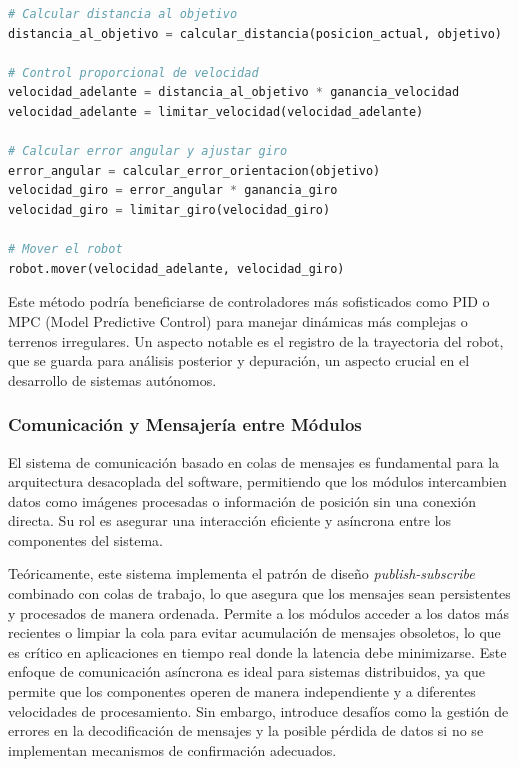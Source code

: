 \begin{lstlisting}[language=Python, caption=Control proporcional para navegación, label=lst:control_proporcional]
# Calcular distancia al objetivo
distancia_al_objetivo = calcular_distancia(posicion_actual, objetivo)

# Control proporcional de velocidad
velocidad_adelante = distancia_al_objetivo * ganancia_velocidad
velocidad_adelante = limitar_velocidad(velocidad_adelante)

# Calcular error angular y ajustar giro
error_angular = calcular_error_orientacion(objetivo)
velocidad_giro = error_angular * ganancia_giro
velocidad_giro = limitar_giro(velocidad_giro)

# Mover el robot
robot.mover(velocidad_adelante, velocidad_giro)
\end{lstlisting}

Este método podría beneficiarse de controladores más sofisticados como PID o MPC (Model Predictive Control) para manejar dinámicas más complejas o terrenos irregulares. Un aspecto notable es el registro de la trayectoria del robot, que se guarda para análisis posterior y depuración, un aspecto crucial en el desarrollo de sistemas autónomos.

\subsubsection{Comunicación y Mensajería entre Módulos}

El sistema de comunicación basado en colas de mensajes es fundamental para la arquitectura desacoplada del software, permitiendo que los módulos intercambien datos como imágenes procesadas o información de posición sin una conexión directa. Su rol es asegurar una interacción eficiente y asíncrona entre los componentes del sistema.

Teóricamente, este sistema implementa el patrón de diseño \textit{publish-subscribe} combinado con colas de trabajo, lo que asegura que los mensajes sean persistentes y procesados de manera ordenada. Permite a los módulos acceder a los datos más recientes o limpiar la cola para evitar acumulación de mensajes obsoletos, lo que es crítico en aplicaciones en tiempo real donde la latencia debe minimizarse. Este enfoque de comunicación asíncrona es ideal para sistemas distribuidos, ya que permite que los componentes operen de manera independiente y a diferentes velocidades de procesamiento. Sin embargo, introduce desafíos como la gestión de errores en la decodificación de mensajes y la posible pérdida de datos si no se implementan mecanismos de confirmación adecuados.

